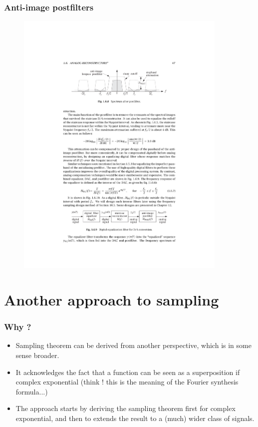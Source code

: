 \begin{frame}
\frametitle{Anti-image postfilters}
\begin{figure}
  \centering
  \includegraphics[width=0.9\textwidth]{antiimagepost}\\
\end{figure}
\end{frame}

\section{Another approach to sampling}
\begin{frame}
\frametitle{Why ?}
\begin{itemize}
\item Sampling theorem can be derived from another perspective, which is in some sense broader.
\item It acknowledges the fact that a function can be seen as a superposition if complex exponential (\alert{think !} this is the meaning of the Fourier synthesis formula...)
\item The approach starts by deriving the sampling theorem first for complex exponential, and then to extends the result to a (much) wider class of signals.    
\end{itemize}
\end{frame}

